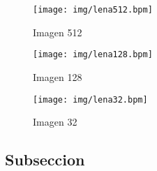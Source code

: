 \documentclass{article}
\begin{document}
\begin{multicols}{2}





\begin{figure}[H]
\centering
\texttt{[image: img/lena512.bpm]}
\caption{Imagen 512}
\label{Imagen 512}
\end{figure}

\begin{figure}[H]
\centering
\texttt{[image: img/lena128.bpm]}
\caption{Imagen 128}
\label{Imagen 128}
\end{figure}

\begin{figure}[H]
\centering
\texttt{[image: img/lena32.bpm]}
\caption{Imagen 32}
\label{Imagen 32}
\end{figure}

\par 

\subsection{Subseccion}
\label{sec3}


\end{multicols}
\end{document}
